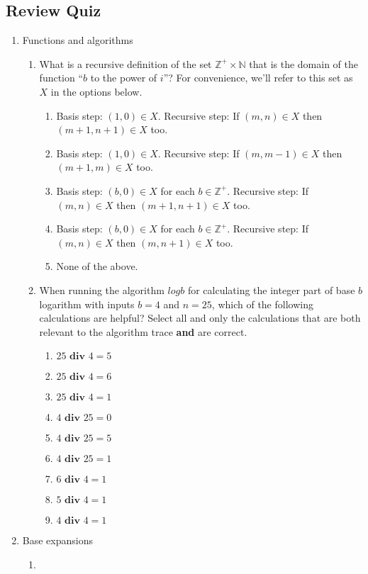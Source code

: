 \documentclass[12pt, oneside]{article}
\begin{document}
\subsection*{Review Quiz}
\begin{enumerate}
\item Functions and algorithms
\begin{enumerate}
    \item {

What is a recursive definition of the set
$\mathbb{Z}^+ \times \mathbb{N}$ that is the domain of the 
function ``$b$ to the power of $i$''?
For convenience, we'll refer to this set as $X$ 
in the options below.

\begin{enumerate}[labelindent=-10pt, leftmargin=-10pt]
    \item[] Basis step: $(1,0) \in X$. Recursive step: If $(m,n) \in X$ then $(m+1, n+1) \in X$ too.
    \item[] Basis step: $(1,0) \in X$. Recursive step: If $(m,m-1) \in X$ then $(m+1, m) \in X$ too.
    \item[] Basis step: $(b,0) \in X$ for each $b \in \mathbb{Z}^+$. Recursive step: If $(m,n) \in X$ then $(m+1, n+1) \in X$ too.
    \item[] Basis step: $(b,0) \in X$ for each $b \in \mathbb{Z}^+$. Recursive step: If $(m,n) \in X$ then $(m, n+1) \in X$ too.
    \item[] None of the above.
\end{enumerate} }
    \item {

When running the algorithm $logb$ for calculating the 
integer part of base $b$ logarithm with inputs $b=4$ and $n=25$, 
which of the following calculations are helpful? Select all and only 
the calculations that are both relevant to the algorithm trace {\bf and}
are correct.

\begin{enumerate}
    \item[] $25 \textbf{ div } 4 = 5$
    \item[] $25 \textbf{ div } 4 = 6$
    \item[] $25 \textbf{ div } 4 = 1$
    \item[] $4 \textbf{ div } 25 = 0$
    \item[] $4 \textbf{ div } 25 = 5$
    \item[] $4 \textbf{ div } 25 = 1$
    \item[] $6 \textbf{ div } 4= 1$
    \item[] $5 \textbf{ div } 4= 1$
    \item[] $4 \textbf{ div } 4= 1$
\end{enumerate} }
\end{enumerate}
\item Base expansions
\begin{enumerate}
    \item {

}
\end{enumerate}
\end{enumerate}
\end{document}
